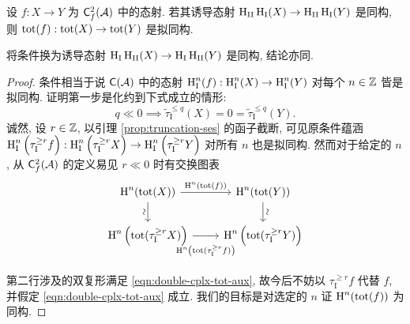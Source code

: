 \begin{theorem}\label{prop:double-cplx-tot}
	设 $f: X \to Y$ 为 $\mathsf{C}^2_f(\mathcal{A})$ 中的态射. 若其诱导态射 $\operatorname{H}_{\mathrm{II}} \operatorname{H}_{\mathrm{I}} (X) \to \operatorname{H}_{\mathrm{II}} \operatorname{H}_{\mathrm{I}} (Y)$ 是同构, 则 $\operatorname{tot}(f): \operatorname{tot}(X) \to \operatorname{tot}(Y)$ 是拟同构.
	
	将条件换为诱导态射 $\operatorname{H}_{\mathrm{I}} \operatorname{H}_{\mathrm{II}} (X) \to \operatorname{H}_{\mathrm{I}} \operatorname{H}_{\mathrm{II}} (Y)$ 是同构, 结论亦同.
\end{theorem}
\begin{proof}
	条件相当于说 $\mathsf{C}(\mathcal{A})$ 中的态射 $\operatorname{H}_{\mathrm{I}}^n(f): \operatorname{H}_{\mathrm{I}}^n(X) \to \operatorname{H}_{\mathrm{I}}^n(Y)$ 对每个 $n \in \mathbb{Z}$ 皆是拟同构. 证明第一步是化约到下式成立的情形:
	\begin{equation}\label{eqn:double-cplx-tot-aux}
		q \ll 0 \implies \tilde{\tau}_{\mathrm{I}}^{\leq q}(X) = 0 = \tilde{\tau}_{\mathrm{I}}^{\leq q}(Y).
	\end{equation}
	诚然, 设 $r \in \mathbb{Z}$, 以引理 \ref{prop:truncation-ses} 的函子截断, 可见原条件蕴涵 $\operatorname{H}_{\mathrm{I}}^n\left( \tau_{\mathrm{I}}^{\geq r} f \right): \operatorname{H}_{\mathrm{I}}^n \left(\tau_{\mathrm{I}}^{\geq r} X \right) \to \operatorname{H}_{\mathrm{I}}^n\left( \tau_{\mathrm{I}}^{\geq r} Y \right)$ 对所有 $n$ 也是拟同构. 然而对于给定的 $n$, 从 $\mathsf{C}^2_f(\mathcal{A})$ 的定义易见 $r \ll 0$ 时有交换图表
	\begin{equation}\label{eqn:double-cplx-tot-aux2}\begin{tikzcd}
		\Hm^n(\tot(X)) \arrow[r, "{\Hm^n(\tot(f))}"] \arrow[d, "\sim"' sloped] & \Hm^n(\tot(Y)) \arrow[d, "\sim" sloped] \\
		\Hm^n\left( \tot(\tau_{\mathrm{I}}^{\geq r} X) \right) \arrow[r, "{\Hm^n\left( \tot (\tau_{\mathrm{I}}^{\geq r} f) \right)}"' inner sep=0.8em] & \Hm^n\left( \tot(\tau_{\mathrm{I}}^{\geq r} Y) \right)
	\end{tikzcd}\end{equation}
	第二行涉及的双复形满足 \eqref{eqn:double-cplx-tot-aux}, 故今后不妨以 $\tau_{\mathrm{I}}^{\geq r} f$ 代替 $f$, 并假定 \eqref{eqn:double-cplx-tot-aux} 成立. 我们的目标是对选定的 $n$ 证 $\operatorname{H}^n(\operatorname{tot}(f))$ 为同构.
	

\end{proof}
